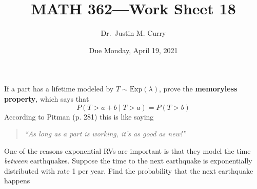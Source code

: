\documentclass[addpoints,12pt]{exam}
\title{\vspace{-1in} MATH 362---Work Sheet 18}
\date{Due Monday, April 19, 2021}
\author{Dr.~Justin M. Curry}
\begin{document}
\maketitle






\begin{questions}

\question[1] If a part has a lifetime modeled by $T\sim \text{Exp}(\lambda)$, prove the \textbf{memoryless property}, which says that
\[
	P(T>a + b \mid T > a) = P(T >b)
\]
According to Pitman (p. 281) this is like saying 
\begin{quote}
\centering
\emph{``As long as a part is working, it's as good as new!''}
\end{quote}

\vspace{1.2in}

\question[4] One of the reasons exponential RVs are important is that they model the time \emph{between} earthquakes. Suppose the time to the next earthquake is exponentially distributed with rate 1 per year. Find the probability that the next earthquake happens

\noaddpoints
{}
\addpoints


\end{questions}
\end{document}
